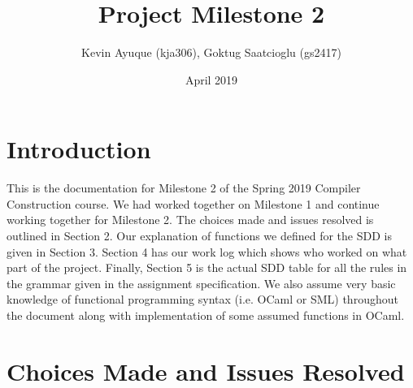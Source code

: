 \documentclass{article}
\title{Project Milestone 2}
\author{Kevin Ayuque (kja306), Goktug Saatcioglu (gs2417)}
\date{April 2019}
\begin{document}
\maketitle

\section{Introduction}

This is the documentation for Milestone 2 of the Spring 2019 Compiler Construction course. We had worked together on Milestone 1 and continue working together for Milestone 2. The choices made and issues resolved is outlined in Section 2. Our explanation of functions we defined for the SDD is given in Section 3. Section 4 has our work log which shows who worked on what part of the project. Finally, Section 5 is the actual SDD table for all the rules in the grammar given in the assignment specification. We also assume very basic knowledge of functional programming syntax (i.e. OCaml or SML) throughout the document along with implementation of some assumed functions in OCaml.

\section{Choices Made and Issues Resolved}
\end{document}
